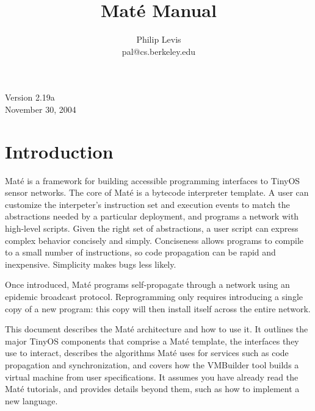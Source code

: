 \documentclass[12pt]{article}
\title{Mat\'{e} Manual}
\author{Philip Levis\\pal@cs.berkeley.edu}
\date{}
\newcommand{\mate}{Mat\'{e}\xspace}
\begin{document}

\maketitle
\vspace{2in}
\begin{center}
Version 2.19a\\
November 30, 2004
\end{center}

\fontsize{10}{10}                               %

\thispagestyle{empty}
\newpage
\tableofcontents
\newpage

\section{Introduction}

\mate is a framework for building accessible programming
interfaces to TinyOS sensor networks. The core of \mate is a bytecode
interpreter template. A user can customize the interpeter's
instruction set and execution events to match the abstractions needed
by a particular deployment, and programs a network with high-level
scripts. Given the right set of abstractions, a user script can
express complex behavior concisely and simply. Conciseness allows
programs to compile to a small number of instructions, so code
propagation can be rapid and inexpensive. Simplicity makes bugs less
likely.

Once introduced, \mate programs self-propagate through a network using
an epidemic broadcast protocol. Reprogramming only requires
introducing a single copy of a new program: this copy will then
install itself across the entire network.

This document describes the \mate architecture and how to use it. It
outlines the major TinyOS components that comprise a \mate template,
the interfaces they use to interact, describes the algorithms \mate
uses for services such as code propagation and synchronization, and
covers how the VMBuilder tool builds a virtual machine from user
specifications. It assumes you have already read the \mate tutorials,
and provides details beyond them, such as how to implement a new
language.
\end{document}
